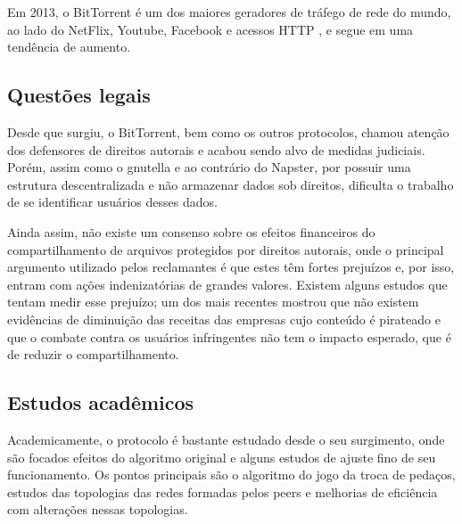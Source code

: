 Em 2013, o BitTorrent é um dos maiores geradores de tráfego de rede do mundo, ao lado
do NetFlix, Youtube, Facebook e acessos HTTP \cite{report:internet-usage-2013}, e segue
em uma tendência de aumento.

\subsection{Questões legais}

Desde que surgiu, o BitTorrent, bem como os outros protocolos, chamou atenção dos
defensores de direitos autorais e acabou sendo alvo de medidas judiciais. Porém, assim
como o \gls*{gnutella} e ao contrário do Napster, por possuir uma estrutura
descentralizada e não armazenar dados sob direitos, dificulta o trabalho de se
identificar usuários desses dados.

Ainda assim, não existe um consenso sobre os efeitos financeiros do compartilhamento de
arquivos protegidos por direitos autorais, onde o principal argumento utilizado pelos
reclamantes é que estes têm fortes prejuízos e, por isso, entram com ações
indenizatórias de grandes valores. Existem alguns estudos que tentam medir esse
prejuízo; um dos mais recentes \cite{report:lse-piracy} mostrou que não existem
evidências de diminuição das receitas das empresas cujo conteúdo é pirateado e que o
combate contra os usuários infringentes não tem o impacto esperado, que é de reduzir o
compartilhamento.

\subsection{Estudos acadêmicos}


Academicamente, o protocolo é bastante estudado desde o seu surgimento, onde são
focados efeitos do algoritmo original e alguns estudos de ajuste fino de seu
funcionamento. Os pontos principais são o algoritmo do jogo da troca de pedaços,
estudos das topologias das redes formadas pelos \glspl*{peer} e melhorias de eficiência
com alterações nessas topologias.

\clearpage